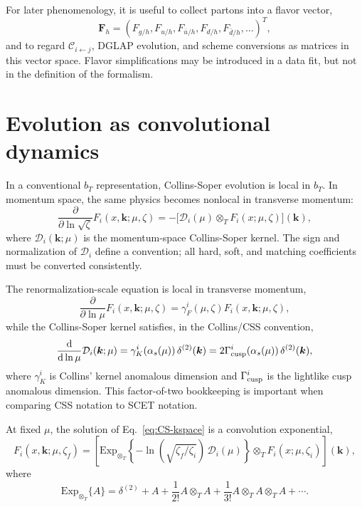 \documentclass[11pt]{article}
\newcommand{\bk}{\bm{k}}
\newcommand{\dd}{\mathrm{d}}
\newcommand{\as}{\alpha_s}
\newcommand{\muR}{\mu}
\newcommand{\deltaT}{\delta^{(2)}}
\newcommand{\ot}{\otimes_T}
\newcommand{\ExpT}{\mathrm{Exp}_{\otimes_T}}
\begin{document}
For later phenomenology, it is useful to collect partons into a flavor vector,
\begin{equation}
  \mathbf F_h
  =
  (F_{g/h},F_{u/h},F_{\bar u/h},F_{d/h},F_{\bar d/h},\ldots)^T,
  \label{eq:flavor-vector-final}
\end{equation}
and to regard $\mathcal C_{i\leftarrow j}$, DGLAP evolution, and scheme conversions as
matrices in this vector space.  Flavor simplifications may be introduced in a data fit,
but not in the definition of the formalism.

\section{Evolution as convolutional dynamics}

In a conventional $b_T$ representation, Collins-Soper evolution is local in $b_T$. In
momentum space, the same physics becomes nonlocal in transverse momentum:
\begin{equation}
  \frac{\partial}{\partial \ln\sqrt{\zeta}}
  F_i(x,\bk;\muR,\zeta)
  =
  -\bigl[\mathcal D_i(\muR)\ot F_i(x;\muR,\zeta)\bigr](\bk),
  \label{eq:CS-kspace}
\end{equation}
where $\mathcal D_i(\bk;\muR)$ is the momentum-space Collins-Soper kernel. The sign and
normalization of $\mathcal D_i$ define a convention; all hard, soft, and matching
coefficients must be converted consistently.

The renormalization-scale equation is local in transverse momentum,
\begin{equation}
  \frac{\partial}{\partial \ln\muR}
  F_i(x,\bk;\muR,\zeta)
  =
  \gamma_F^i(\muR,\zeta)
  F_i(x,\bk;\muR,\zeta),
  \label{eq:mu-evolution}
\end{equation}
while the Collins-Soper kernel satisfies, in the Collins/CSS convention,
\begin{equation}
  \frac{\dd}{\dd\ln\muR}\mathcal D_i(\bk;\muR)
  =
  \gamma_K^i(\as(\muR))\,\deltaT(\bk)
  =2\Gamma_{\rm cusp}^i(\as(\muR))\,\deltaT(\bk),
  \label{eq:D-RG-kspace}
\end{equation}
where $\gamma_K^i$ is Collins' kernel anomalous dimension and
$\Gamma_{\rm cusp}^i$ is the lightlike cusp anomalous dimension. This factor-of-two
bookkeeping is important when comparing CSS notation to SCET notation.

At fixed $\muR$, the solution of Eq.~\eqref{eq:CS-kspace} is a convolution exponential,
\begin{equation}
  F_i(x,\bk;\muR,\zeta_f)
  =
  \left[
  \ExpT\!
  \left
    \{-\ln\!\left(\sqrt{\zeta_f/\zeta_i}\right)\,\mathcal D_i(\muR)\right\}
  \ot
  F_i(x;\muR,\zeta_i)
  \right](\bk),
  \label{eq:conv-exponential}
\end{equation}
where
\begin{equation}
  \ExpT\{A\}
  =
  \deltaT + A + \frac{1}{2!}A\ot A + \frac{1}{3!}A\ot A\ot A + \cdots .
\end{equation}
\end{document}
